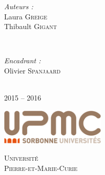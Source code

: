 \documentclass[12pt]{article}
\begin{document}
\begin{titlepage}

\begin{minipage}{0.4\textwidth}
\begin{flushleft} \large
\emph{Auteurs :}\\
Laura \textsc{Greige}\\ %
Thibault \textsc{Gigant}\\ %
\end{flushleft}
\end{minipage}
~
\begin{minipage}{0.4\textwidth}
\begin{flushright} \large
\emph{Encadrant :} \\
Olivier \textsc{Spanjaard}\\ %
\end{flushright}
\end{minipage}\\[2cm]


\vspace{3cm}
{\large 2015 -- 2016}\\[2cm] %


\vfill
\begin{center}
\includegraphics[width=5cm]{upmc-logotype.png}

\medskip
\textsc{\large Universit\'{e}\\ Pierre-et-Marie-Curie}%
\end{center}
 

\vfill %

\end{titlepage}
\end{document}

